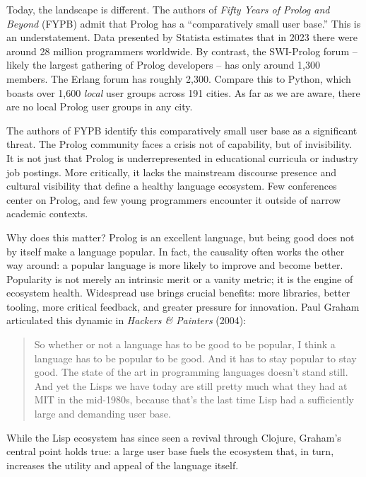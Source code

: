 Today, the landscape is different. The authors of \textit{Fifty Years of Prolog and Beyond} (FYPB) admit that Prolog has a ``comparatively small user base.'' This is an understatement. Data presented by Statista estimates that in 2023 there were around 28 million programmers worldwide. By contrast, the SWI-Prolog forum -- likely the largest gathering of Prolog developers -- has only around 1,300 members. The Erlang forum has roughly 2,300. Compare this to Python, which boasts over 1,600 \textit{local} user groups across 191 cities. As far as we are aware, there are no local Prolog user groups in any city.

The authors of FYPB identify this comparatively small user base as a significant threat. The Prolog community faces a crisis not of capability, but of invisibility. It is not just that Prolog is underrepresented in educational curricula or industry job postings. More critically, it lacks the mainstream discourse presence and cultural visibility that define a healthy language ecosystem. Few conferences center on Prolog, and few young programmers encounter it outside of narrow academic contexts.

Why does this matter? Prolog is an excellent language, but being good does not by itself make a language popular. In fact, the causality often works the other way around: a popular language is more likely to improve and become better. Popularity is not merely an intrinsic merit or a vanity metric; it is the engine of ecosystem health. Widespread use brings crucial benefits: more libraries, better tooling, more critical feedback, and greater pressure for innovation. Paul Graham articulated this dynamic in \textit{Hackers \& Painters} (2004):

\begin{quote} So whether or not a language has to be good to be popular, I think a language has to be popular to be good. And it has to stay popular to stay good. The state of the art in programming languages doesn't stand still. And yet the Lisps we have today are still pretty much what they had at MIT in the mid-1980s, because that's the last time Lisp had a sufficiently large and demanding user base. \end{quote}

\noindent While the Lisp ecosystem has since seen a revival through Clojure, Graham's central point holds true: a large user base fuels the ecosystem that, in turn, increases the utility and appeal of the language itself.

